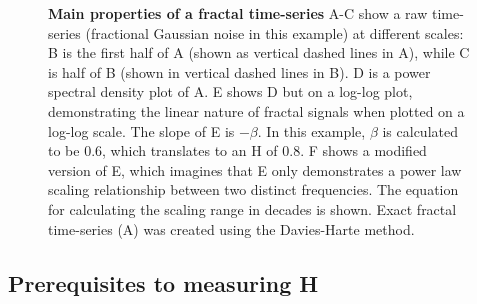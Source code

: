 \documentclass[
  sn-vancouver,
  Numbered,
  referee,
  lineno]{sn-jnl}
\begin{document}
\begin{figure}[H]


\caption{\label{fig-fourprop}\textbf{Main properties of a fractal
time-series} A-C show a raw time-series (fractional Gaussian noise in
this example) at different scales: B is the first half of A (shown as
vertical dashed lines in A), while C is half of B (shown in vertical
dashed lines in B). D is a power spectral density plot of A. E shows D
but on a log-log plot, demonstrating the linear nature of fractal
signals when plotted on a log-log scale. The slope of E is \(-\beta\).
In this example, \(\beta\) is calculated to be 0.6, which translates to
an H of 0.8. F shows a modified version of E, which imagines that E only
demonstrates a power law scaling relationship between two distinct
frequencies. The equation for calculating the scaling range in decades
is shown. Exact fractal time-series (A) was created using the
Davies-Harte method.}

\end{figure}%

\subsection{Prerequisites to measuring
H}\label{prerequisites-to-measuring-h}
\end{document}

